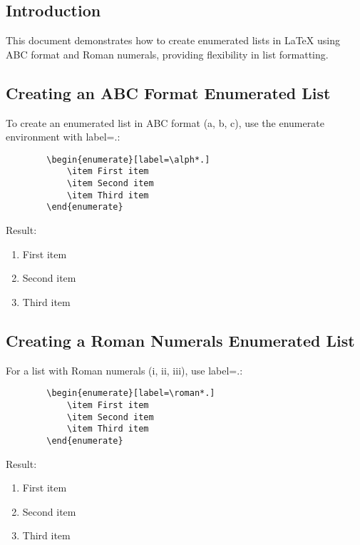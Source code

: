 \documentclass[12pt,a4paper]{article}
\begin{document}
	\subsection{Introduction}
	This document demonstrates how to create enumerated lists in LaTeX using ABC format and Roman numerals, providing flexibility in list formatting.
	
	\subsection{Creating an ABC Format Enumerated List}
	To create an enumerated list in ABC format (a, b, c), use the enumerate environment with label=\alph*.:
	
	\begin{verbatim}
		\begin{enumerate}[label=\alph*.]
			\item First item
			\item Second item
			\item Third item
		\end{enumerate}
	\end{verbatim}
	
	Result:
	
	\begin{enumerate}[label=\alph*.]
		\item First item
		\item Second item
		\item Third item
	\end{enumerate}
	
	\subsection{Creating a Roman Numerals Enumerated List}
	For a list with Roman numerals (i, ii, iii), use label=\roman*.:
	
	\begin{verbatim}
		\begin{enumerate}[label=\roman*.]
			\item First item
			\item Second item
			\item Third item
		\end{enumerate}
	\end{verbatim}
	
	Result:
	
	\begin{enumerate}[label=\roman*.]
		\item First item
		\item Second item
		\item Third item
	\end{enumerate}
	\newpage
\end{document}
